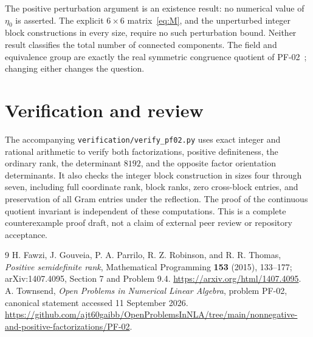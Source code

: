 \documentclass[11pt]{article}
\begin{document}
The positive perturbation argument is an existence result: no numerical value of $\eta_0$ is asserted. The explicit $6\times6$ matrix~\eqref{eq:M}, and the unperturbed integer block constructions in every size, require no such perturbation bound. Neither result classifies the total number of connected components. The field and equivalence group are exactly the real symmetric congruence quotient of PF-02~\cite{catalog}; changing either changes the question.


\section{Verification and review}
The accompanying \texttt{verification/verify\_pf02.py} uses exact integer and rational arithmetic to verify both factorizations, positive definiteness, the ordinary rank, the determinant $8192$, and the opposite factor orientation determinants. It also checks the integer block construction in sizes four through seven, including full coordinate rank, block ranks, zero cross-block entries, and preservation of all Gram entries under the reflection. The proof of the continuous quotient invariant is independent of these computations. This is a complete counterexample proof draft, not a claim of external peer review or repository acceptance.

\begin{thebibliography}{9}
H. Fawzi, J. Gouveia, P. A. Parrilo, R. Z. Robinson, and R. R. Thomas,
\emph{Positive semidefinite rank}, Mathematical Programming \textbf{153} (2015), 133--177; arXiv:1407.4095, Section 7 and Problem 9.4.
\url{https://arxiv.org/html/1407.4095}.
A. Townsend, \emph{Open Problems in Numerical Linear Algebra}, problem PF-02,
canonical statement accessed 11 September 2026.
\url{https://github.com/ajt60gaibb/OpenProblemsInNLA/tree/main/nonnegative-and-positive-factorizations/PF-02}.
\end{thebibliography}
\end{document}

